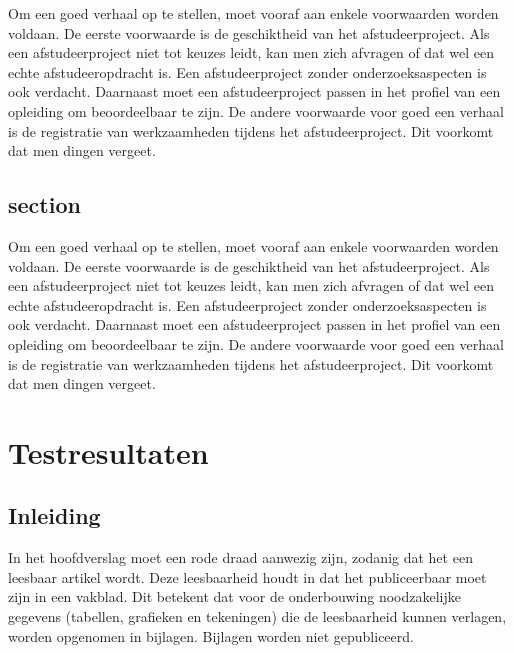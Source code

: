 		Om een goed verhaal op te stellen, moet vooraf aan enkele voorwaarden
		worden voldaan. De eerste voorwaarde is de geschiktheid van het
		afstudeerproject. Als een afstudeerproject niet tot keuzes leidt, kan
		men zich afvragen of dat wel een echte afstudeeropdracht is. Een
		afstudeerproject zonder onderzoeksaspecten is ook verdacht. Daarnaast
		moet een afstudeerproject passen in het profiel van een opleiding om
		beoordeelbaar te zijn. De andere voorwaarde voor goed een verhaal is
		de registratie van werkzaamheden tijdens het afstudeerproject. Dit
		voorkomt dat men dingen vergeet.
		\section{section}
		
		Om een goed verhaal op te stellen, moet vooraf aan enkele voorwaarden
		worden voldaan. De eerste voorwaarde is de geschiktheid van het
		afstudeerproject. Als een afstudeerproject niet tot keuzes leidt, kan
		men zich afvragen of dat wel een echte afstudeeropdracht is. Een
		afstudeerproject zonder onderzoeksaspecten is ook verdacht. Daarnaast
		moet een afstudeerproject passen in het profiel van een opleiding om
		beoordeelbaar te zijn. De andere voorwaarde voor goed een verhaal is
		de registratie van werkzaamheden tijdens het afstudeerproject. Dit
		voorkomt dat men dingen vergeet.
		
		
		\chapter{Testresultaten}
		
		\section{Inleiding}
		In het hoofdverslag moet een rode draad aanwezig zijn,
		zodanig dat het een leesbaar artikel wordt. Deze leesbaarheid houdt in
		dat het publiceerbaar moet zijn in een vakblad. Dit betekent dat voor
		de onderbouwing noodzakelijke gegevens (tabellen, grafieken en
		tekeningen) die de leesbaarheid kunnen verlagen, worden opgenomen in
		bijlagen. Bijlagen worden niet gepubliceerd.
		
		
		
			
